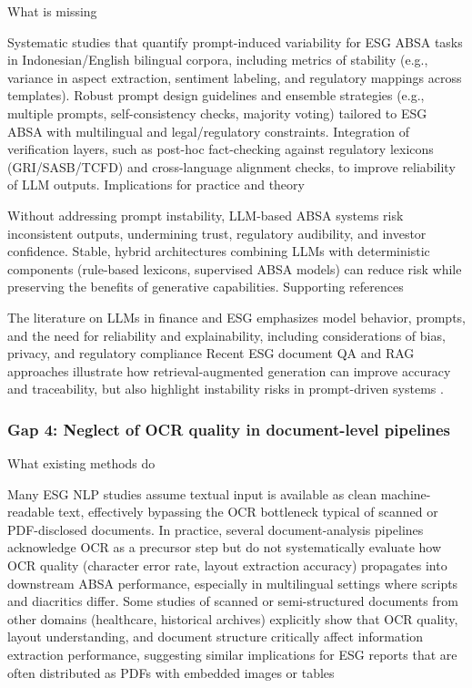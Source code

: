 What is missing

Systematic studies that quantify prompt-induced variability for ESG ABSA tasks in Indonesian/English bilingual corpora, including metrics of stability (e.g., variance in aspect extraction, sentiment labeling, and regulatory mappings across templates).
Robust prompt design guidelines and ensemble strategies (e.g., multiple prompts, self-consistency checks, majority voting) tailored to ESG ABSA with multilingual and legal/regulatory constraints.
Integration of verification layers, such as post-hoc fact-checking against regulatory lexicons (GRI/SASB/TCFD) and cross-language alignment checks, to improve reliability of LLM outputs.
Implications for practice and theory

Without addressing prompt instability, LLM-based ABSA systems risk inconsistent outputs, undermining trust, regulatory audibility, and investor confidence.
Stable, hybrid architectures combining LLMs with deterministic components (rule-based lexicons, supervised ABSA models) can reduce risk while preserving the benefits of generative capabilities.
Supporting references

The literature on LLMs in finance and ESG emphasizes model behavior, prompts, and the need for reliability and explainability, including considerations of bias, privacy, and regulatory compliance \cite{10.21203/rs.3.rs-6614220/v1,10.1142/9789811250903_0004,10.30574/ijsra.2024.11.1.0305}
Recent ESG document QA and RAG approaches illustrate how retrieval-augmented generation can improve accuracy and traceability, but also highlight instability risks in prompt-driven systems \cite{10.1609/aaai.v38i21.30574}.

\subsubsection{Gap 4: Neglect of OCR quality in document-level pipelines}
What existing methods do

Many ESG NLP studies assume textual input is available as clean machine-readable text, effectively bypassing the OCR bottleneck typical of scanned or PDF-disclosed documents.
In practice, several document-analysis pipelines acknowledge OCR as a precursor step but do not systematically evaluate how OCR quality (character error rate, layout extraction accuracy) propagates into downstream ABSA performance, especially in multilingual settings where scripts and diacritics differ.
Some studies of scanned or semi-structured documents from other domains (healthcare, historical archives) explicitly show that OCR quality, layout understanding, and document structure critically affect information extraction performance, suggesting similar implications for ESG reports that are often distributed as PDFs with embedded images or tables \cite{10.1109/icdar.2011.302,10.1093/jamiaopen/ooac045,10.21203/rs.3.rs-6644838/v1,10.3390/app122111063}

